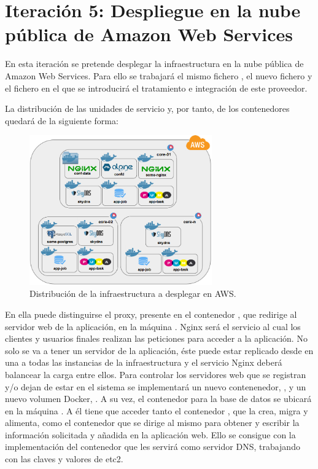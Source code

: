 \section[Iteración 5: Despliegue en Amazon Web Services]{Iteración 5: Despliegue en la nube pública de Amazon Web Services}

En esta iteración se pretende desplegar la infraestructura en la nube pública de Amazon Web Services. Para ello se trabajará el mismo fichero , el nuevo fichero  y el fichero  en el que se introducirá el tratamiento e integración de este proveedor.

La distribución de las unidades de servicio y, por tanto, de los contenedores quedará de la siguiente forma:

\begin{figure}[H]
\centering
\includegraphics[width=0.7\textwidth]{images/figures/aws-1-iteration.png}
\caption{Distribución de la infraestructura a desplegar en AWS.}
\label{fig:aws-1-iteration}
\end{figure}

En ella puede distinguirse el proxy, presente en el contenedor , que redirige al servidor web de la aplicación, en la máquina . Nginx será el servicio al cual los clientes y usuarios finales realizan las peticiones para acceder a la aplicación. No solo se va a tener un servidor de la aplicación, éste puede estar replicado desde en una a todas las instancias de la infraestructura y el servicio Nginx deberá balancear la carga entre ellos. Para controlar los servidores web que se registran y/o dejan de estar en el sistema se implementará un nuevo contenenedor, , y un nuevo volumen Docker, . A su vez, el contenedor  para la base de datos se ubicará en la máquina . A él tiene que acceder tanto el contenedor , que la crea, migra y alimenta, como el contenedor  que se dirige al mismo para obtener y escribir la información solicitada y añadida en la aplicación web. Ello se consigue con la implementación del contenedor  que les servirá como servidor DNS, trabajando con las claves y valores de etc2.

